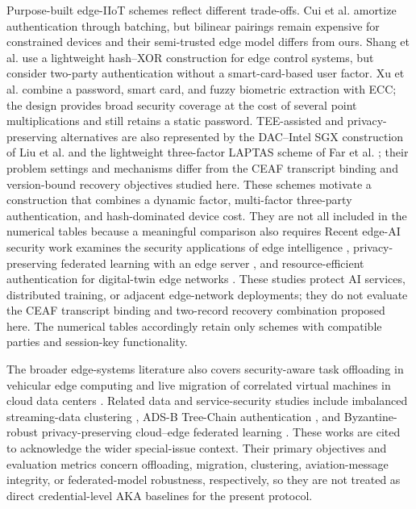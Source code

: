 \documentclass[cmc,article,submit,moreauthors,pdftex]{Definitions/tsp}
\providecommand{\DIFadd}[1]{{\protect\color{blue} \sf #1}} %
\providecommand{\DIFdel}[1]{{\protect\color{red} \scriptsize #1}} %
\providecommand{\DIFaddbegin}{} %
\providecommand{\DIFaddend}{} %
\providecommand{\DIFdelbegin}{} %
\providecommand{\DIFdelend}{} %
\begin{document}
Purpose-built edge-IIoT schemes reflect different trade-offs. Cui et al. \cite{cui} amortize authentication through batching, but bilinear pairings remain expensive for constrained devices and their semi-trusted edge model differs from ours. Shang et al. \cite{shang} use a lightweight hash--XOR construction for edge control systems, but consider two-party authentication without a smart-card-based user factor. Xu et al. \cite{xu} combine a password, smart card, and fuzzy biometric extraction with ECC; the design provides broad security coverage at the cost of several point multiplications and still retains a static password. \DIFaddbegin \DIFadd{TEE-assisted and privacy-preserving alternatives are also represented by the DAC--Intel SGX construction of Liu et al. \cite{liu2021sgx} and the lightweight three-factor LAPTAS scheme of Far et al. \cite{far}; their problem settings and mechanisms differ from the CEAF transcript binding and version-bound recovery objectives studied here. }\DIFaddend These schemes motivate a construction that combines a dynamic factor, multi-factor three-party authentication, and hash-dominated device cost. \DIFdelbegin \DIFdel{They are not all included in the numerical tables because a meaningful comparison also requires }\DIFdelend \DIFaddbegin \DIFadd{Recent edge-AI security work examines the security applications of edge intelligence \cite{mohamed2023edge}, privacy-preserving federated learning with an edge server \cite{xu2024secfl}, and resource-efficient authentication for digital-twin edge networks \cite{wang2025read}. These studies protect AI services, distributed training, or adjacent edge-network deployments; they do not evaluate the CEAF transcript binding and two-record recovery combination proposed here. The numerical tables accordingly retain only schemes with }\DIFaddend compatible parties and session-key functionality.

\DIFaddbegin \DIFadd{The broader edge-systems literature also covers security-aware task offloading in vehicular edge computing \cite{xiao2026secureoffloading} and live migration of correlated virtual machines in cloud data centers \cite{sun2015vmmigration}. Related data and service-security studies include imbalanced streaming-data clustering \cite{zhang2025selfgrowth}, ADS-B Tree-Chain authentication \cite{yue2026adsb}, and Byzantine-robust privacy-preserving cloud--edge federated learning \cite{zhang2026brppfl}. These works are cited to acknowledge the wider special-issue context. Their primary objectives and evaluation metrics concern offloading, migration, clustering, aviation-message integrity, or federated-model robustness, respectively, so they are not treated as direct credential-level AKA baselines for the present protocol.
}
\end{document}
